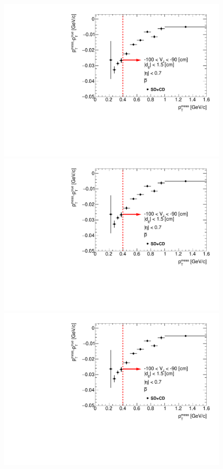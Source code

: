\begin{figure}[H]
{  \includegraphics[width=\linewidth,page=9]{graphics/energyLoss/energyLoss3DGlobal_OnePrtAlso.pdf}\\
  \includegraphics[width=\linewidth,page=12]{graphics/energyLoss/energyLoss3DGlobal_OnePrtAlso.pdf}\\
  \includegraphics[width=\linewidth,page=15]{graphics/energyLoss/energyLoss3DGlobal_OnePrtAlso.pdf}\\
}
\end{figure}
